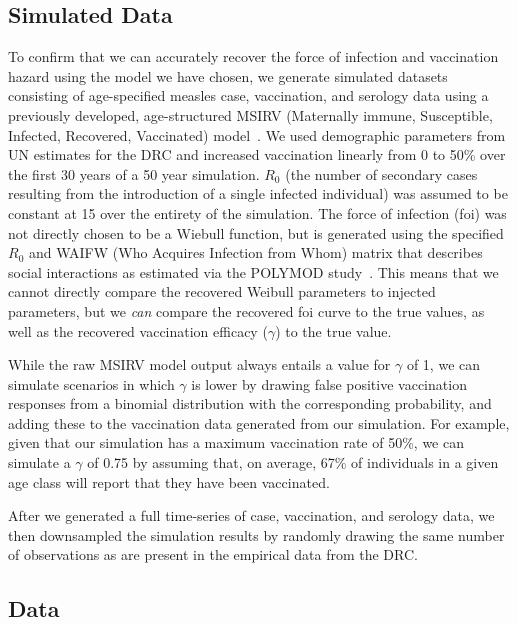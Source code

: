 \documentclass[nofootinbib,aps,pre,twocolumn,superscriptaddress,showkeys,showpacs]{revtex4-1}
\begin{document}
\subsection{Simulated Data\label{subsec:SimData}}
To confirm that we can accurately recover the force of infection and vaccination hazard using the model we have chosen, we generate simulated datasets consisting of age-specified measles case, vaccination, and serology data using a previously developed, age-structured MSIRV (Maternally immune, Susceptible, Infected, Recovered, Vaccinated) model~\cite{Metcalf2012}. We used demographic parameters from UN estimates for the DRC and increased vaccination linearly from 0 to 50\% over the first 30 years of a 50 year simulation. $R_{0}$ (the number of secondary cases resulting from the introduction of a single infected individual) was assumed to be constant at 15 over the entirety of the simulation. The force of infection (foi) was not directly chosen to be a Wiebull function, but is generated using the specified $R_0$ and WAIFW (Who Acquires Infection from Whom) matrix that describes social interactions as estimated via the POLYMOD study~\cite{Mossong2008}. This means that we cannot directly compare the recovered Weibull parameters to injected parameters, but we \emph{can} compare the recovered foi curve to the true values, as well as the recovered vaccination efficacy ($\gamma$) to the true value. 

While the raw MSIRV model output always entails a value for $\gamma$ of 1, we can simulate scenarios in which $\gamma$ is lower by drawing false positive vaccination responses from a binomial distribution with the corresponding probability, and adding these to the vaccination data generated from our simulation. For example, given that our simulation has a maximum vaccination rate of 50\%, we can simulate a $\gamma$ of 0.75 by assuming that, on average, 67\% of individuals in a given age class will report that they have been vaccinated.

After we generated a full time-series of case, vaccination, and serology data, we then downsampled the simulation results by randomly drawing the same number of observations as are present in the empirical data from the DRC.

\subsection{Data \label{subsec:Data}}
\end{document}
